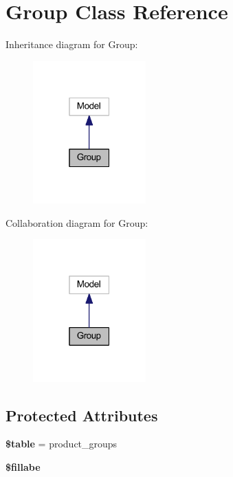 \hypertarget{class_app_1_1_models_1_1_product_1_1_group}{}\section{Group Class Reference}
\label{class_app_1_1_models_1_1_product_1_1_group}


Inheritance diagram for Group\+:
\nopagebreak
\begin{figure}[H]
\begin{center}
\leavevmode
\includegraphics[width=123pt]{class_app_1_1_models_1_1_product_1_1_group__inherit__graph}
\end{center}
\end{figure}


Collaboration diagram for Group\+:
\nopagebreak
\begin{figure}[H]
\begin{center}
\leavevmode
\includegraphics[width=123pt]{class_app_1_1_models_1_1_product_1_1_group__coll__graph}
\end{center}
\end{figure}
\subsection*{Protected Attributes}
\begin{DoxyCompactItemize}
\item 
\mbox{\label{class_app_1_1_models_1_1_product_1_1_group_ae8876a14058f368335baccf35af4a22b}} 
{\bfseries \$table} = \textquotesingle{}product\+\_\+groups\textquotesingle{}
\item 
{\bfseries \$fillabe}
\end{DoxyCompactItemize}


